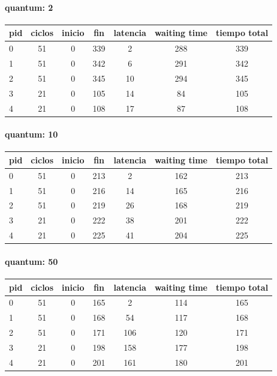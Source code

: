 \paragraph{quantum: 2}\par
\begin{tabular}{ l | c | c | c | c | c | c | }
  \hline			
  pid & ciclos & inicio & fin & latencia & waiting time & tiempo total  \\
  \hline
 0 & 51 & 0 & 339 & 2 & 288 & 339\\
1 & 51 & 0 & 342 & 6 & 291 & 342\\
2 & 51 & 0 & 345 & 10 & 294 & 345\\
3 & 21 & 0 & 105 & 14 & 84 & 105\\
4 & 21 & 0 & 108 & 17 & 87 & 108\\
  \hline
\end{tabular}
\paragraph{quantum: 10}\par
\begin{tabular}{ l | c | c | c | c | c | c | }
  \hline			
  pid & ciclos & inicio & fin & latencia & waiting time & tiempo total  \\
  \hline
0 & 51 & 0 & 213 & 2 & 162 & 213\\
1 & 51 & 0 & 216 & 14 & 165 & 216\\
2 & 51 & 0 & 219 & 26 & 168 & 219\\
3 & 21 & 0 & 222 & 38 & 201 & 222\\
4 & 21 & 0 & 225 & 41 & 204 & 225\\
\hline
\end{tabular}
\paragraph{quantum: 50}
\begin{tabular}{ l | c | c | c | c | c | c | }
  \hline			
  pid & ciclos & inicio & fin & latencia & waiting time & tiempo total  \\
  \hline
0 & 51 & 0 & 165 & 2 & 114 & 165\\
1 & 51 & 0 & 168 & 54 & 117 & 168\\
2 & 51 & 0 & 171 & 106 & 120 & 171\\
3 & 21 & 0 & 198 & 158 & 177 & 198\\
4 & 21 & 0 & 201 & 161 & 180 & 201\\
  \hline
\end{tabular}
